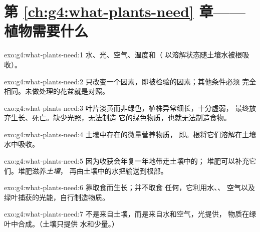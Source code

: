 \section*{第 \ref{ch:g4:what-plants-need} 章——植物需要什么}

\begin{solution}{exo:g4:what-plants-need:1}
水、光、空气、温度和（
以溶解状态随土壤水被根吸收）。
\end{solution}

\begin{solution}{exo:g4:what-plants-need:2}
只改变一个因素，即被检验的因素；其他条件必须
完全相同。未做处理的花盆就是对照。
\end{solution}

\begin{solution}{exo:g4:what-plants-need:3}
叶片淡黄而非绿色，植株异常细长，十分虚弱，
最终放弃生长、死亡。缺少光照，无法制造
它的绿色物质，也就无法制造食物。
\end{solution}

\begin{solution}{exo:g4:what-plants-need:4}
土壤中存在的微量营养物质，
即。根将它们溶解在土壤水中吸收。
\end{solution}

\begin{solution}{exo:g4:what-plants-need:5}
因为收获会年复一年地带走土壤中的；
堆肥可以补充它们。堆肥滋养\emph{土壤}，
再由土壤中的水把输送到根部。
\end{solution}

\begin{solution}{exo:g4:what-plants-need:6}
靠取食而生长；并不取食
任何，它利用水、、
空气以及绿叶捕获的光能，自行制造物质。
\end{solution}

\begin{solution}{exo:g4:what-plants-need:7}
不是来自土壤，而是来自水和空气，光提供，
物质在绿叶中合成。（土壤只提供
水和少量。）
\end{solution}

